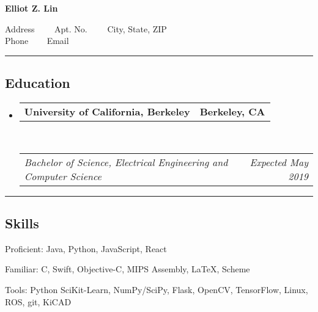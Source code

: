 \documentclass[10pt,letterpaper]{article}
\makeatletter
\newenvironment{indentsection}[1]%
{\begin{list}{}%
	{\setlength{\leftmargin}{#1}}%
	\item[]%
}
{\end{list}}
\newcommand{\headerrow}[2]
{\begin{tabular*}{\linewidth}{l@{\extracolsep{\fill}}r}
	#1 &
	#2 \\
\end{tabular*}}
\newcommand{\CPP}
{C\nolinebreak[4]\hspace{-.05em}\raisebox{.22ex}{\footnotesize\bf ++}}
\makeatother
\begin{document}
\begin{center}
{\LARGE \textbf{Elliot Z. Lin}}

Address\ \ \textbullet
\ \ Apt. No.\ \ \textbullet
\ \ City, State, ZIP
\\
Phone \ \textbullet
\ \ Email
\end{center}

\hrule
\vspace{-0.4em}
\subsection*{Education}

\begin{itemize}
	\parskip=0.1em

	\item 
	\headerrow
		{\textbf{University of California, Berkeley}}
		{\textbf{Berkeley, CA}}
	\\
	\headerrow
		{\emph{Bachelor of Science, Electrical Engineering and Computer Science}}
		{\emph{Expected May 2019}}

\end{itemize}


\hrule
\vspace{-0.4em}
\subsection*{Skills}

\begin{indentsection}{\parindent}
\begin{description*}
	\item[Proficient:]
	Java, Python, JavaScript, React
	\item[Familiar:]
	\CPP, Swift, Objective-C, MIPS Assembly, \LaTeX, Scheme
	\item[Tools:]
	Python SciKit-Learn, NumPy/SciPy, Flask, OpenCV, TensorFlow, Linux, ROS, git, KiCAD
\end{description*}
\end{indentsection}
\end{document}
